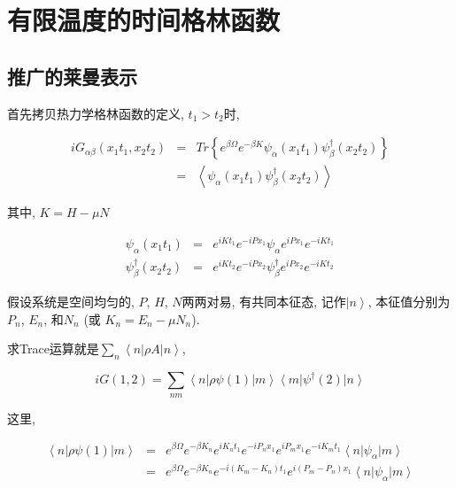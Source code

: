 \section{有限温度的时间格林函数}

\subsection{推广的莱曼表示}

首先拷贝热力学格林函数的定义, $t_1 > t_2$时,

\begin{eqnarray*}
  iG_{\alpha \beta} (x_1 t_1, x_2 t_2) &=& Tr \left\{ e^{\beta \Omega}
e^{-\beta K } \psi_\alpha (x_1 t_1) \psi_\beta^\dagger (x_2
t_2) \right\} \\
  {} &=& \left\langle \psi_\alpha (x_1 t_1)
\psi_\beta^\dagger (x_2 t_2) \right\rangle
\end{eqnarray*}

其中, $K = H - \mu N$

\begin{eqnarray*}
  \psi_\alpha(x_1 t_1) &=& e^{iK t_1} e^{-i P x_1} \psi_\alpha e^{i P x_1} e^{-i K t_1 } \\
  \psi^{\dagger}_{\beta} (x_2 t_2) &=& e^{i K t_2} e^{-i P x_2} \psi^{\dagger}_{\beta} e^{i P x_2} e^{-i K t_2 }
\end{eqnarray*}


假设系统是空间均匀的, $P$, $H$, $N$两两对易, 有共同本征态,
记作$\left| n \right\rangle$, 本征值分别为$P_n$, $E_n$, 和$N_n$ (或
$K_n = E_n - \mu N_n$).

求Trace运算就是$\sum_n \left\langle n \right| \rho A \left| n
\right\rangle $,

\begin{equation*}
iG(1,2) = \sum_{nm} \left\langle n \right| \rho \psi(1) \left| m
\right\rangle \left\langle m \right| \psi^\dagger(2) \left| n
\right\rangle
\end{equation*}

这里,

\begin{eqnarray*}
  \left\langle n \right| \rho \psi(1) \left| m \right\rangle &=& e^{\beta \Omega} e^{-\beta K_n} e^{i K_n t_1} e^{-i P_n x_1}
e^{i P_m x_1} e^{- i K_m t_1}  \left\langle n \right| \psi_\alpha
\left| m \right\rangle \\
  {} &=& e^{\beta \Omega} e^{-\beta K_n} e^{- i(K_m - K_n) t_1} e^{i (P_m
- P_n) x_1} \left\langle n \right| \psi_\alpha \left| m
\right\rangle
\end{eqnarray*}

